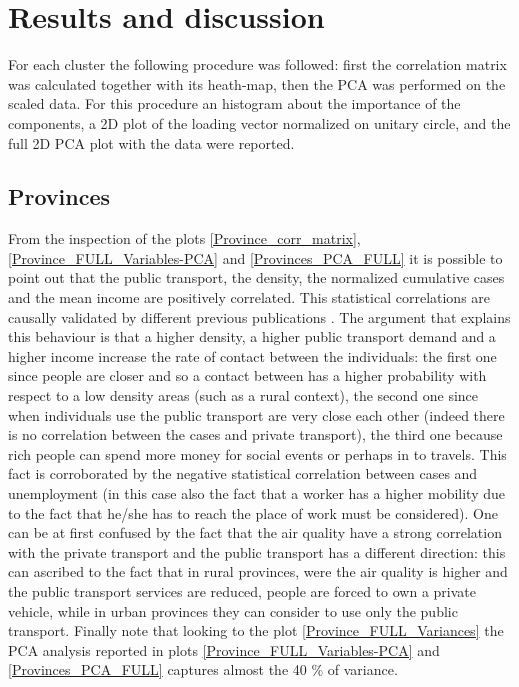\documentclass[
12pt, %
a4paper, %
oneside, %
headinclude,footinclude, %
BCOR5mm, %
]{scrartcl}
\begin{document}
\section{Results and discussion}

For each cluster the following procedure was followed: first the correlation matrix was calculated together with its heath-map, then the PCA was performed on the scaled data. For this procedure an histogram about the importance of the components, a 2D plot of the loading vector normalized on unitary circle, and the full 2D PCA plot with the data were reported. 

\subsection{Provinces}

From the inspection of the plots \ref{Province_corr_matrix},\ref{Province_FULL_Variables-PCA} and \ref{Provinces_PCA_FULL} it is possible to point out that the public transport, the density, the normalized cumulative cases and the mean income are positively correlated. This statistical correlations are causally validated by different previous publications \cite{neiderud2015urbanization,world2010hidden,gangemi2020rich,weyers2008low}. The argument that explains this behaviour is that a higher density, a higher public transport demand and a higher income increase the rate of contact between the individuals: the first one since people are closer and so a contact between has a higher probability with respect to a low density areas (such as a rural context), the second one since when individuals use the public transport are very close each other (indeed there is no correlation between the cases and private transport), the third one because rich people can spend more money for social events or perhaps in to travels. This fact is corroborated by the negative statistical correlation between cases and unemployment (in this case also the fact that a worker has a higher mobility due to the fact that he/she has to reach the place of work must be considered). One can be at first confused by the fact that the air quality have a strong correlation with the private transport and the public transport has a different direction: this can ascribed to the fact that in rural provinces, were the air quality is higher and the public transport services are reduced,  people are forced to own a private vehicle, while in urban provinces they can consider to use only the public transport. Finally note that looking to the plot \ref{Province_FULL_Variances} the PCA analysis reported in plots \ref{Province_FULL_Variables-PCA} and \ref{Provinces_PCA_FULL} captures almost the 40 $\%$ of variance. 
\end{document}
